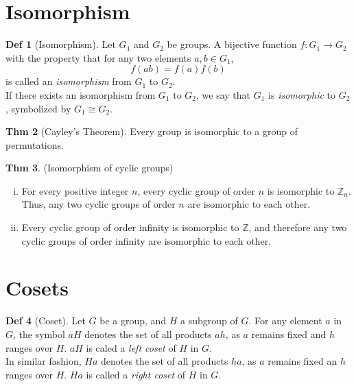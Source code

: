 \documentclass{article}
\theoremstyle{definition}
\newtheorem{definition}{Def}[section]
\newtheorem{theorem}[definition]{Thm}
\begin{document}

\section{Isomorphism}

\begin{definition}[Isomorphism]
    Let $G_1$ and $G_2$ be groups. A bijective function $f: G_1 \rightarrow G_2$ with the property that for any two elements $a, b \in G_1$,
    $$f(ab) = f(a)f(b)$$
    is called an \emph{isomorphism} from $G_1$ to $G_2$.
    \\
    If there exists an isomorphism from $G_1$ to $G_2$, we say that $G_1$ is \emph{isomorphic} to $G_2$, symbolized by $G_1 \cong G_2$.
\end{definition}


\begin{theorem}[Cayley's Theorem]
    Every group is isomorphic to a group of permutations.
\end{theorem}

\begin{theorem}
    (Isomorphism of cyclic groups)
    \begin{enumerate}[i.]
	\item For every positive integer $n$, every cyclic group of order $n$ is isomorphic to $\mathbb{Z}_n$. Thus, any two cyclic groups of order $n$ are isomorphic to each other.
	\item Every cyclic group of order infinity is isomorphic to $\mathbb{Z}$, and therefore any two cyclic groups of order infinity are isomorphic to each other.
    \end{enumerate}
\end{theorem}

\section{Cosets}

\begin{definition}[Coset]
    Let $G$ be a group, and $H$ a subgroup of $G$. For any element $a$ in $G$, the symbol $aH$ denotes the set of all products $ah$, as $a$ remains fixed and $h$ ranges over $H$. $aH$ is caled a \emph{left coset} of $H$ in $G$.
    \\
    In similar fashion, $Ha$ denotes the set of all products $ha$, as $a$ remains fixed an $h$ ranges over $H$. $Ha$ is called a \emph{right coset} of $H$ in $G$.
\end{definition}
\end{document}
